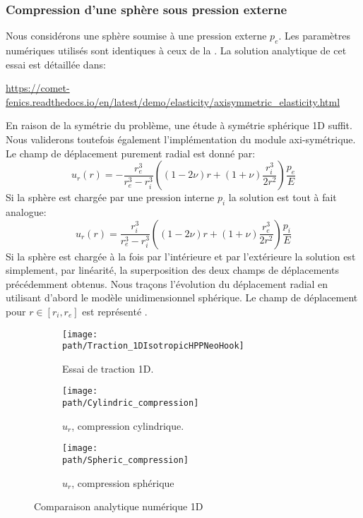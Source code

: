 \documentclass[10pt]{book}
\def\path{./fig}
\begin{document}
\subsubsection{Compression d'une sphère sous pression externe}\label{Section:Compression d'une sphère sous pression externe}
Nous considérons une sphère soumise à une pression externe $p_{e}$. Les paramètres numériques utilisés sont identiques à ceux de la . La solution analytique de cet essai est détaillée dans:
\begin{center}
\url{https://comet-fenics.readthedocs.io/en/latest/demo/elasticity/axisymmetric_elasticity.html}
\end{center}
En raison de la symétrie du problème, une étude à symétrie sphérique 1D suffit. Nous validerons toutefois également l'implémentation du module axi-symétrique. Le champ de déplacement purement radial est donné par:
\begin{equation}
u_{r}(r)=-\dfrac{r_{e}^{3}}{r_{e}^{3}-r_{i}^{3}}\left((1-2\nu)r+(1+\nu)\dfrac{r_{i}^{3}}{2r^{2}}\right)\dfrac{p_{e}}{E}
\label{eq:solution_sphere_pression_externe}
\end{equation}
Si la sphère est chargée par une pression interne $p_{i}$ la solution est tout à fait analogue:
\begin{equation}
u_{r}(r)=\dfrac{r_{i}^{3}}{r_{e}^{3}-r_{i}^{3}}\left((1-2\nu)r+(1+\nu)\dfrac{r_{e}^{3}}{2r^{2}}\right)\dfrac{p_{i}}{E}
\label{eq:solution_sphere_pression_interne}
\end{equation}
Si la sphère est chargée à la fois par l'intérieure et par l'extérieure la solution est simplement, par linéarité, la superposition des deux champs de déplacements précédemment obtenus. Nous traçons l'évolution du déplacement radial en utilisant d'abord le modèle unidimensionnel sphérique. Le champ de déplacement pour $r\in[r_{i},r_{e}]$ est représenté .
\begin{figure}[h!]
\begin{subfigure}[b]{0.32\textwidth}
\centering \texttt{[image: \\path/Traction\_1DIsotropicHPPNeoHook]}
\caption{Essai de traction 1D.}
\label{fig:traction_1D_simple_HPP_Neo_Hook}
\end{subfigure}\hfill
\begin{subfigure}[b]{0.32\textwidth}
\centering \texttt{[image: \\path/Cylindric\_compression]}
\caption{$u_{r}$, compression cylindrique.}
\label{fig:compa_analytique_compr_cyl}
\end{subfigure}\hfill
\begin{subfigure}[b]{0.32\textwidth}
\centering \texttt{[image: \\path/Spheric\_compression]}
\caption{$u_{r}$, compression sphérique}
\label{fig:compa_analytique_compr_sph1D}
\end{subfigure}
\caption{Comparaison analytique numérique 1D}
\end{figure}
\FloatBarrier
\end{document}
